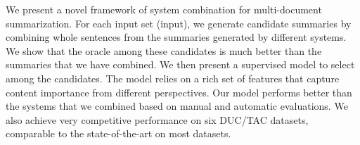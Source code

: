 We present a novel framework of system combination for multi-document summarization. For each input set (input), we generate candidate summaries by combining whole sentences from the summaries generated by different systems. We show that the oracle among these candidates is much better than the summaries that we have combined. We then present a supervised model to select among the candidates. The model relies on a rich set of features that capture content importance from different perspectives. Our model performs better than the systems that we combined based on manual and automatic evaluations. We also achieve very competitive performance on six DUC/TAC datasets, comparable to the state-of-the-art on most datasets.
